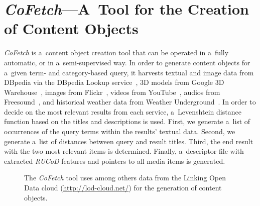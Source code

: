 \documentclass[runningheads,a4paper]{llncs}
\begin{document}
\section{\mbox{\emph{CoFetch}}---A~Tool for the Creation of Content Objects}
\mbox{\emph{CoFetch}} is a~content object creation tool
that can be operated in a~fully automatic, or in a~semi-supervised way.
In order to generate content objects for a~given term- and category-based query,
it harvests textual and image data from DBpedia
via the DBpedia Lookup service~\cite{lookup},
3D models from Google 3D Warehouse~\cite{3dwarehouse},
images from Flickr~\cite{flickr}, videos from YouTube~\cite{youtube},
audios from Freesound~\cite{freesound},
and historical weather data from Weather Underground~\cite{wunderground}.
In order to decide on the most relevant results from each service,
a~Levenshtein distance function based on the titles and descriptions is used.
First, we generate a~list of occurrences of the query terms
within the results' textual data.
Second, we generate a~list of distances between query and result titles.
Third, the end result with the two most relevant items is determined.
Finally, a~descriptor file with extracted \emph{\mbox{RUCoD}} features
and pointers to all media items is generated.

\begin{figure}[]
\vspace{-1.5em}
  \centering
    \qquad
\caption{The \mbox{\emph{CoFetch}} tool uses among others data from the Linking Open Data cloud (\url{http://lod-cloud.net/}) for the generation of content objects.}
\label{fig:cofetch}
\vspace{-2.8em}
\end{figure}



\end{document}
